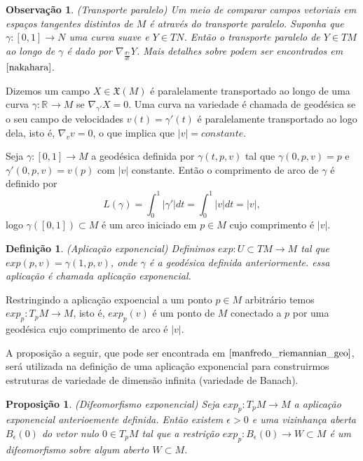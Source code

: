\documentclass[12pt]{book}
\newtheorem{definicao}[teorema]{Definição}
\newtheorem{observacao}[teorema]{Observação}
\newtheorem{proposicao}[teorema]{Proposição}
\newcommand{\campossuaves}[1]{\mathfrak{X}(#1)}
\newcommand{\real}[1]{\mathbb{R}^{#1}}
\begin{document}
	\begin{observacao}\label{observacao_transporte_paralelo}
		(Transporte paralelo) Um meio de comparar campos vetoriais em espaços tangentes distintos de $M$ é através do transporte paralelo. Suponha que $\gamma:[0,1] \to N$ uma curva suave e $Y \in TN$. Então o transporte paralelo de $Y \in TM$ ao longo de $\gamma$ é dado por 
		$\nabla_{\frac{d\gamma}{dt}}Y$. Mais detalhes sobre podem ser encontrados em $\cite{nakahara}$.
	\end{observacao}
	
	Dizemos um campo $X \in \campossuaves{M}$ é paralelamente transportado ao longo de uma curva $\gamma:\real{} \to M$ se $\nabla_{\gamma'}X=0$. Uma curva na variedade é chamada de geodésica se o seu campo de velocidades $v(t) = \gamma'(t)$ é paralelamente transportado ao logo dela, isto é, $\nabla_{v}v=0$, o que implica que $|v| = constante$.
	
	Seja $\gamma:[0,1] \to M$ a geodésica definida por $\gamma(t,p,v)$ tal que $\gamma(0,p,v) = p$ e $\gamma'(0,p,v) = v(p)$ com $|v|$ constante. Então o comprimento de arco de $\gamma$ é definido por 
	$$
	L(\gamma) =  \int_{0}^{1}|\gamma'|dt = \int_{0}^{1}|v|dt = |v|,
	$$
	logo $\gamma([0,1]) \subset M$ é um arco iniciado em $p \in M$ cujo comprimento é $|v|$.
	\begin{definicao}\label{definicao_aplicacao_exponencial}
		(Aplicação exponencial) Definimos $exp:U \subset TM \to M$ tal que $exp(p,v) = \gamma(1, p, v)$, onde $\gamma$ é a geodésica definida anteriormente. essa aplicação é chamada aplicação exponencial.
	\end{definicao}
	
	Restringindo a aplicação expoencial a um ponto $p \in M$ arbitrário temos $exp_{p}:T_{p}M \to M$, isto é, $exp_{p}(v)$ é um ponto de $M$ conectado a $p$ por uma geodésica cujo comprimento de arco é $|v|$. 
	
	A proposição a seguir, que pode ser encontrada em $\cite{manfredo_riemannian_geo}$, será utilizada na definição de uma aplicação exponencial para construirmos estruturas de variedade de dimensão infinita (variedade de Banach).
	
	\begin{proposicao}\label{proposicao_difeomorfismo_exponencial}
		(Difeomorfismo exponencial) Seja  $exp_{p}:T_{p}M \to M$ a aplicação exponencial anterioemente definida. Então existem $\epsilon>0$ e uma vizinhança aberta $B_{\epsilon}(0)$ do vetor nulo $0 \in T_{p}M$ tal que a restrição $exp_{p}:B_{\epsilon}(0) \to W \subset M$ é um difeomorfismo sobre algum aberto $W \subset M$.
	\end{proposicao}
	
\end{document}
